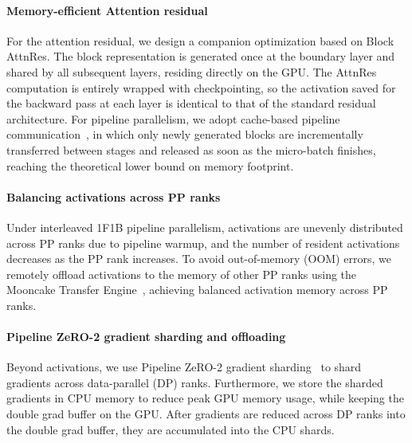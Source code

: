 \paragraph{Memory-efficient Attention residual}
For the attention residual, we design a companion optimization based on Block AttnRes.
The block representation is generated once at the boundary layer and shared by all subsequent layers, residing directly on the GPU.
The AttnRes computation is entirely wrapped with checkpointing, so the activation saved for the backward pass at each layer is identical to that of the standard residual architecture.
For pipeline parallelism, we adopt cache-based pipeline communication~\citep{kimiteam2026attnres}, in which only newly generated blocks are incrementally transferred between stages and released as soon as the micro-batch finishes, reaching the theoretical lower bound on memory footprint.

\paragraph{Balancing activations across PP ranks}
Under interleaved 1F1B pipeline parallelism, activations are unevenly distributed across PP ranks due to pipeline warmup, and the number of resident activations decreases as the PP rank increases.
To avoid out-of-memory (OOM) errors, we remotely offload activations to the memory of other PP ranks using the Mooncake Transfer Engine~\citep{qin2024mooncake}, achieving balanced activation memory across PP ranks.

\paragraph{Pipeline ZeRO-2 gradient sharding and offloading}
\label{para:pipeline-zero2}
Beyond activations, we use Pipeline ZeRO-2 gradient sharding~\citep{glm5team2026glm5vibecodingagentic} to shard gradients across data-parallel (DP) ranks.
Furthermore, we store the sharded gradients in CPU memory to reduce peak GPU memory usage, while keeping the double grad buffer on the GPU.
After gradients are reduced across DP ranks into the double grad buffer, they are accumulated into the CPU shards.

